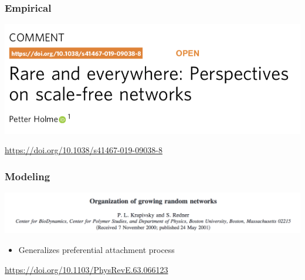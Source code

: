 \documentclass[aspectratio=169]{beamer}
\begin{document}
\begin{frame}
\frametitle{Empirical}

\begin{center}
\includegraphics[width=\textwidth]{figures/holme_rare_2019_title}
\end{center}

\vfill
\url{https://doi.org/10.1038/s41467-019-09038-8}



\end{frame}
\begin{frame}
\frametitle{Modeling}

\begin{center}
\includegraphics[width=\textwidth]{figures/krapivsky_organization_2001_title}
\end{center}

\begin{itemize}
\item Generalizes preferential attachment process
\end{itemize}

\vfill
\url{https://doi.org/10.1103/PhysRevE.63.066123}


\end{frame}
\end{document}
